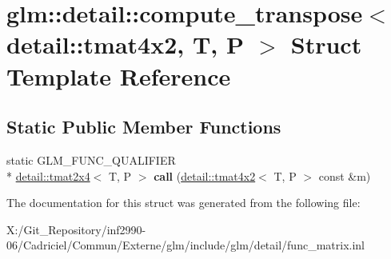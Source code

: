 \hypertarget{structglm_1_1detail_1_1compute__transpose_3_01detail_1_1tmat4x2_00_01_t_00_01_p_01_4}{\section{glm\-:\-:detail\-:\-:compute\-\_\-transpose$<$ detail\-:\-:tmat4x2, T, P $>$ Struct Template Reference}
\label{structglm_1_1detail_1_1compute__transpose_3_01detail_1_1tmat4x2_00_01_t_00_01_p_01_4}
}
\subsection*{Static Public Member Functions}
\begin{DoxyCompactItemize}
\item 
\hypertarget{structglm_1_1detail_1_1compute__transpose_3_01detail_1_1tmat4x2_00_01_t_00_01_p_01_4_a345735a0a7bc0fa49d41693771b8c72e}{static G\-L\-M\-\_\-\-F\-U\-N\-C\-\_\-\-Q\-U\-A\-L\-I\-F\-I\-E\-R \\*
\hyperlink{structglm_1_1detail_1_1tmat2x4}{detail\-::tmat2x4}$<$ T, P $>$ {\bfseries call} (\hyperlink{structglm_1_1detail_1_1tmat4x2}{detail\-::tmat4x2}$<$ T, P $>$ const \&m)}\label{structglm_1_1detail_1_1compute__transpose_3_01detail_1_1tmat4x2_00_01_t_00_01_p_01_4_a345735a0a7bc0fa49d41693771b8c72e}

\end{DoxyCompactItemize}


The documentation for this struct was generated from the following file\-:\begin{DoxyCompactItemize}
\item 
X\-:/\-Git\-\_\-\-Repository/inf2990-\/06/\-Cadriciel/\-Commun/\-Externe/glm/include/glm/detail/func\-\_\-matrix.\-inl\end{DoxyCompactItemize}
